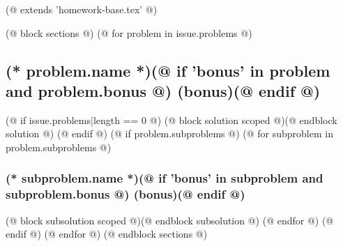 (@ extends 'homework-base.tex' @)

(@ block sections @)
    (@ for problem in issue.problems @)
        \subsection{(* problem.name *)(@ if 'bonus' in problem and problem.bonus @) (bonus)(@ endif @)}
        \label{sec:(* problem.id *)}
        (@ if issue.problems|length == 0 @)
            (@ block solution scoped @)(@ endblock solution @)
        (@ endif @)
        (@ if problem.subproblems @)
            (@ for subproblem in problem.subproblems @)
                \subsubsection{(* subproblem.name *)(@ if 'bonus' in subproblem and subproblem.bonus @) (bonus)(@ endif @)}
                \label{sec:(* problem.id*)-(* subproblem.id *)}
                (@ block subsolution scoped @)(@ endblock subsolution @)
            (@ endfor @)
        (@ endif @)
    (@ endfor @)
(@ endblock sections @)
